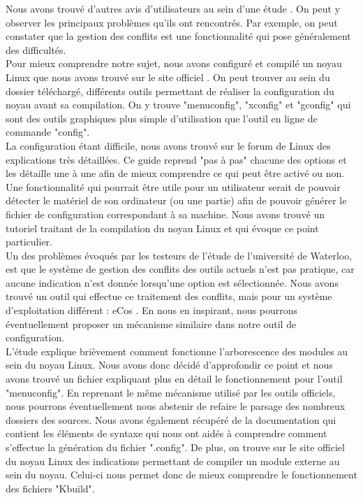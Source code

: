 \documentclass[16pts]{report}
\begin{document}
Nous avons trouvé d'autres avis d'utilisateurs au sein d'une étude
\cite{Hubaux:2012:USC:2110147.2110164}. On peut y observer les principaux
problèmes qu'ils ont rencontrés. Par exemple, on peut constater que la gestion
des conflits est une fonctionnalité qui pose généralement des difficultés.
\\

Pour mieux comprendre notre sujet, nous avons configuré et compilé un noyau
Linux que nous avons trouvé sur le site officiel \cite{Kernel}. On peut trouver
au sein du dossier téléchargé, différents outils permettant de réaliser la
configuration du noyau avant sa compilation. On y trouve "menuconfig",
"xconfig" et "gconfig" qui sont des outils graphiques plus simple d'utilisation
que l'outil en ligne de commande "config".
\\

La configuration étant difficile, nous avons trouvé sur le forum de Linux
\cite{Existant:Kernel:ForumTutoConfig} des explications très détaillées. Ce
guide reprend "pas à pas" chacune des options et les détaille une à une afin
de mieux comprendre ce qui peut être activé ou non.
\\

Une fonctionnalité qui pourrait être utile pour un utilisateur serait de
pouvoir détecter le matériel de son ordinateur (ou une partie) afin de pouvoir
générer le fichier de configuration correspondant à sa machine. Nous avons
trouvé un tutoriel \cite{Existant:Kernel:outils} traitant de la compilation du
noyau Linux et qui évoque ce point particulier.
\\

Un des problèmes évoqués par les testeurs de l'étude \cite{Waterloo:Etude} de
l'université de Waterloo, est que le système de gestion des conflits des outils
actuels n'est pas pratique, car aucune indication n'est donnée lorsqu'une
option est sélectionnée. Nous avons trouvé un outil qui effectue ce traitement
des conflits, mais pour un système d'exploitation différent : eCos
\cite{Existant:EcosConfig}. En nous en inspirant, nous pourrons éventuellement
proposer un mécanisme similaire dans notre outil de configuration.
\\

L'étude \cite{Waterloo:Etude} explique brièvement comment fonctionne
l'arborescence des modules au sein du noyau Linux. Nous avons donc décidé
d'approfondir ce point et nous avons trouvé un fichier
\cite{Existant:Kconfig:frontends} expliquant plus en détail le fonctionnement
pour l'outil "menuconfig". En reprenant le même mécanisme utilisé par les
outils officiels, nous pourrons éventuellement nous abstenir de refaire le
parsage des nombreux dossiers des sources. Nous avons également récupéré de la
documentation \cite{Existant:Kconfig:vueDensemble}
\cite{Existant:Kconfig:langage} qui contient les éléments de syntaxe qui nous
ont aidés à comprendre comment s'effectue la génération du fichier ".config".
De plus, on trouve sur le site officiel du noyau Linux des indications
\cite{Existant:Kconfig:modules} permettant de compiler un module externe au
sein du noyau. Celui-ci nous permet donc de mieux comprendre le fonctionnement
des fichiers "Kbuild".
\end{document}
